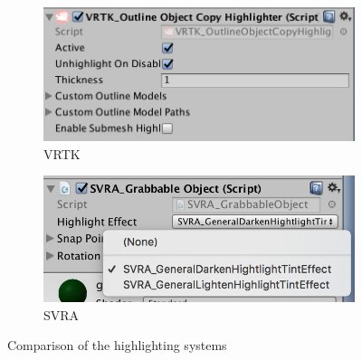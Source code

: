 \documentclass{l4proj}
\begin{document}
\begin{figure}[h]
\begin{subfigure}[h]{0.4\linewidth}
\includegraphics[width=\linewidth]{dissertation/vrtk-highlight.png}
\caption{VRTK}
\end{subfigure}
\hfill
\begin{subfigure}[h]{0.4\linewidth}
\includegraphics[width=\linewidth]{dissertation/svra-highlight.png}
\caption{SVRA}
\end{subfigure}
\caption{Comparison of the highlighting systems}
\end{figure}
\end{document}
